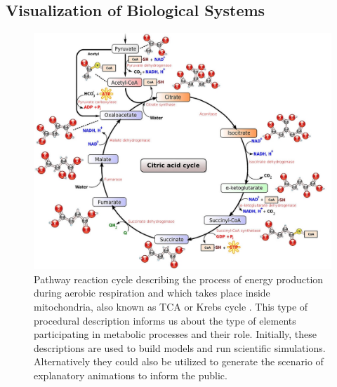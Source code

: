 
\subsection{Visualization of Biological Systems}

\begin{figure}
\centering
\includegraphics[width=0.7\linewidth]{graphics/Citric_acid_cycle_noi}
\caption{Pathway reaction cycle describing the process of energy production during aerobic respiration and which takes place inside mitochondria, also known as TCA or Krebs cycle \cite{Krebs}. This type of procedural description informs us about the type of elements participating in metabolic processes and their role. Initially, these descriptions are used to build models and run scientific simulations. Alternatively they could also be utilized to generate the scenario of explanatory animations to inform the public.}
\label{fig:reductivetcacycle}
\end{figure}

